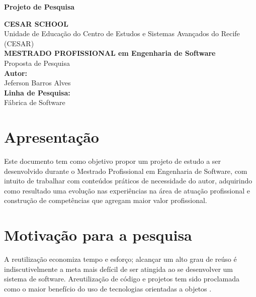 \documentclass[10pt,a4paper]{article}
\begin{document}
\begin{titlepage}
\begin{center}{\bf \Large Projeto de Pesquisa}\\[3.5cm]
\end{center}
\begin{flushright}
{\bf CESAR SCHOOL}\\
{Unidade de Educação do Centro de Estudos e Sistemas Avançados do Recife}
{(CESAR)}\\[3.5cm]
{\bf \large MESTRADO PROFISSIONAL em Engenharia de Software}\\
{Proposta de Pesquisa}\\[2.5cm] 
{\bf Autor:}\\
{Jeferson Barros Alves}\\[0.8cm]
{\bf Linha de Pesquisa:}\\
{Fábrica de Software}\\[0.8cm]
\end{flushright}
\end{titlepage}
 

\tableofcontents
{}
\newpage

\section{Apresentação}
Este documento tem como objetivo propor um projeto de estudo a ser desenvolvido durante o Mestrado Profissional em Engenharia de Software, com intuito de trabalhar com conteúdos práticos de necessidade do autor, adquirindo como resultado uma evolução nas experiências na área de atuação profissional e construção de competências que agregam maior valor profissional.

\section{Motivação para a pesquisa}
A reutilização economiza tempo e esforço; alcançar um alto grau de reúso é indiscutivelmente a meta mais defícil de ser atingida ao se desenvolver um sistema de software. Areutilização de código e projetos tem sido proclamada como o maior benefício do uso de tecnologias orientadas a objetos \cite{pressman2011}.
\end{document}
